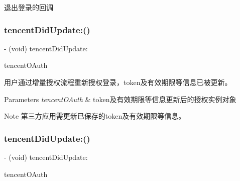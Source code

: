 退出登录的回调 \mbox{\label{protocol_tencent_session_delegate-p_ab6add86989fc2acf54c93c6adb7e445e}} 
\subsubsection{\texorpdfstring{tencent\+Did\+Update\+:()}{tencentDidUpdate:()}\hspace{0.1cm}{\footnotesize\ttfamily [1/2]}}
{\footnotesize\ttfamily -\/ (void) tencent\+Did\+Update\+: \begin{DoxyParamCaption}\item[{(\mbox{\hyperlink{interface_tencent_o_auth}{Tencent\+O\+Auth}} $\ast$)}]{tencent\+O\+Auth }\end{DoxyParamCaption}\hspace{0.3cm}{\ttfamily [optional]}}

用户通过增量授权流程重新授权登录，token及有效期限等信息已被更新。 
\begin{DoxyParams}{Parameters}
{\em tencent\+O\+Auth} & token及有效期限等信息更新后的授权实例对象 \\
\hline
\end{DoxyParams}
\begin{DoxyNote}{Note}
第三方应用需更新已保存的token及有效期限等信息。 
\end{DoxyNote}
\mbox{\label{protocol_tencent_session_delegate-p_ab6add86989fc2acf54c93c6adb7e445e}} 
\subsubsection{\texorpdfstring{tencent\+Did\+Update\+:()}{tencentDidUpdate:()}\hspace{0.1cm}{\footnotesize\ttfamily [2/2]}}
{\footnotesize\ttfamily -\/ (void) tencent\+Did\+Update\+: \begin{DoxyParamCaption}\item[{(\mbox{\hyperlink{interface_tencent_o_auth}{Tencent\+O\+Auth}} $\ast$)}]{tencent\+O\+Auth }\end{DoxyParamCaption}\hspace{0.3cm}{\ttfamily [optional]}}

